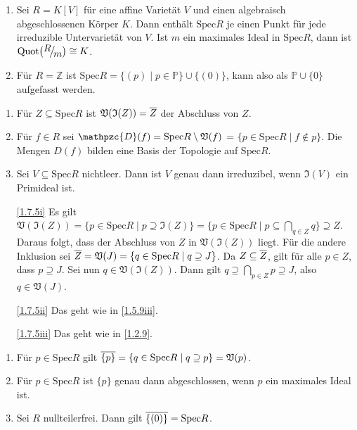 \documentclass[a4paper,12pt]{scrbook}
\makeatletter
\theoremstyle{blah}
\theoremstyle{stz}
\renewcommand{\proofname}{Beweis}
\renewenvironment{proof}[1][\proofname]{\par
  \pushQED{\qed}%
  \normalfont \topsep6\p@\@plus6\p@\relax
  \trivlist
  \item[\hskip\labelsep
        \itshape
    #1\@addpunct{:}]\ignorespaces
}{%
  \popQED\endtrivlist\@endpefalse
}
\def\V{\mathfrak{V}}
\def\I{\mathfrak{I}}
\def\P{\mathbb{P}}
\newcommand{\D}{\mathpzc{D}}
\newcommand{\Spec}{\mathrm{Spec}}
\newcommand{\Quot}{\mathrm{Quot}}
\newcommand{\set}[1]{\ensuremath{\mathbb{#1}}}
\newcommand{\Z}{\set{Z}}
\def\Bar#1{\ensuremath\overline{#1}}
\newcommand{\Quotient}[2]{
  \raisebox{0.7ex}{\ensuremath{#1}}
  \ensuremath{\mkern-3mu}\big/\ensuremath{\mkern-3mu}
  \raisebox{-0.6ex}{\ensuremath{#2}}}
\makeatother
\begin{document}
\begin{bsp}\label{1.7.4}
  \begin{enumerate}
  \item\label{1.7.4i} Sei $R=K[V]$ für eine affine Varietät $V$ und einen algebraisch abgeschlossenen Körper $K$. Dann enthält
    $\Spec R$ je einen Punkt für jede irreduzible Untervarietät von $V$. Ist $m$ ein maximales Ideal in $\Spec R$, dann ist
    $\Quot\bigl(\Quotient{R}{m}\bigr)\cong K$.
  \item\label{1.7.4ii} Für $R=\Z$ ist $\Spec R = \{(p)\mid p\in\P\}\cup\{(0)\}$, kann also als $\P\cup\{0\}$ aufgefasst werden.
  \end{enumerate}
\end{bsp}

\begin{bem}\label{1.7.5}
  \begin{enumerate}
  \item\label{1.7.5i} Für $Z\subseteq\Spec R$ ist $\V(\I(Z))=\Bar{Z}$ der Abschluss von $Z$.
  \item\label{1.7.5ii} Für $f\in R$ sei $\D(f)=\Spec R\setminus\V(f)$ = $\{p\in\Spec R\mid f\notin p\}$. Die Mengen $D(f)$
    bilden eine Basis der Topologie auf $\Spec R$.
  \item\label{1.7.5iii} Sei $V\subseteq\Spec R$ nichtleer. Dann ist $V$ genau dann irreduzibel, wenn $\I(V)$ ein Primideal ist.
  \end{enumerate}
\end{bem}
\begin{proof}
  \begin{enumerate}
  \item[\ref{1.7.5i}] Es gilt $\V(\I(Z))=\{p\in\Spec R\mid p\supseteq\I(Z)\} = \{p\in\Spec R\mid p\subseteq\bigcap_{q\in Z}q\}
    \supseteq Z$. Daraus folgt, dass der Abschluss von $Z$ in $\V(\I(Z))$ liegt. Für die andere Inklusion sei
    $\Bar{Z}=\V(J)=\{q\in\Spec R\mid q\supseteq J\}$. Da $Z\subseteq\Bar{Z}$, gilt für alle $p\in Z$, dass $p\supseteq J$. Sei
    nun $q\in\V(\I(Z))$. Dann gilt $q\supseteq\bigcap_{p\in Z}p\supseteq J$, also $q\in\V(J)$.
  \item[\ref{1.7.5ii}] Das geht wie in \autoref{1.5.9iii}.
  \item[\ref{1.7.5iii}] Das geht wie in \autoref{1.2.9}.
  \end{enumerate}
\end{proof}

\begin{bem}\label{1.7.6}
  \begin{enumerate}
  \item\label{1.7.6i} Für $p\in\Spec R$ gilt $\Bar{\{p\}}=\{q\in\Spec R\mid q\supseteq p\}=\V(p)$.
  \item\label{1.7.6ii} Für $p\in\Spec R$ ist $\{p\}$ genau dann abgeschlossen, wenn $p$ ein maximales Ideal ist.
  \item\label{1.7.6iii} Sei $R$ nullteilerfrei. Dann gilt $\Bar{\{(0)\}}=\Spec R$.
  \end{enumerate}
\end{bem}
\end{document}
